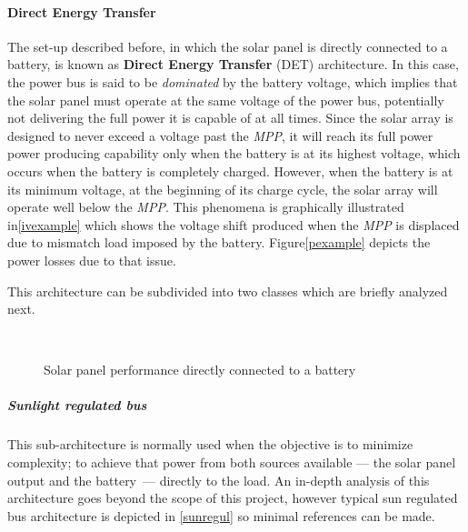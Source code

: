 	\paragraph{Direct Energy Transfer} \label{det}
	
	The set-up described before, in which the solar panel is directly connected to a battery, is known as \textbf{Direct Energy Transfer} (\acrshort{DET}) architecture. In this case, the power bus is said to be \textit{dominated} by the battery voltage, which implies that the solar panel must operate at the same voltage of the power bus, potentially not delivering the full power it is capable of at all times. Since the solar array is designed to never exceed a voltage past the \textit{MPP}, it will reach its full power power producing capability only when the battery is at its highest voltage, which occurs when the battery is completely charged. However, when the battery is at its minimum voltage, at the beginning of its charge cycle, the solar array will operate well below the \textit{MPP}. This phenomena is graphically illustrated in\autoref{ivexample} which shows the voltage shift produced when the \textit{MPP} is displaced due to mismatch load imposed by the battery. Figure\autoref{pexample} depicts the power losses due to that issue.

This architecture can be subdivided into two classes which are briefly analyzed next.


	\begin{figure} 
					\centering		
					\\[3ex]	
					\caption{Solar panel performance directly connected to a battery} \label{compexample}
			\end{figure}

	\subparagraph{Sunlight regulated bus} \label{sunlightregulated}
	
	This sub-architecture is normally used when the objective is to minimize complexity; to achieve that power from both sources available --- the solar panel output and the battery~--- directly to the load. An in-depth analysis of this architecture goes beyond the scope of this project, however typical sun regulated bus architecture is depicted in \autoref{sunregul} so minimal references can be made. 
	
